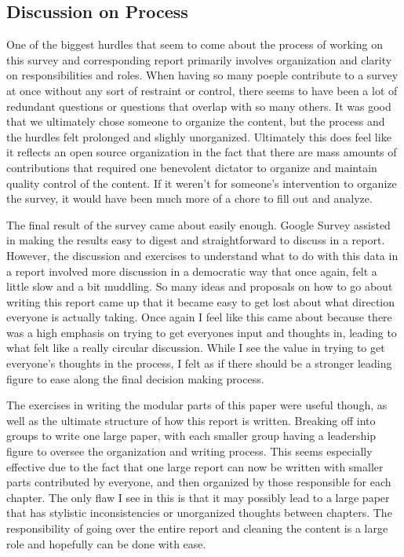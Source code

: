 \subsection{Discussion on Process}

One of the biggest hurdles that seem to come about the process of working on this survey and corresponding report primarily involves organization and clarity on responsibilities and roles. When having so many poeple contribute to a survey at once without any sort of restraint or control, there seems to have been a lot of redundant questions or questions that overlap with so many others. It was good that we ultimately chose someone to organize the content, but the process and the hurdles felt prolonged and slighly unorganized. Ultimately this does feel like it reflects an open source organization in the fact that there are mass amounts of contributions that required one benevolent dictator to organize and maintain quality control of the content. If it weren't for someone's intervention to organize the survey, it would have been much more of a chore to fill out and analyze. 

The final result of the survey came about easily enough. Google Survey assisted in making the results easy to digest and straightforward to discuss in a report. However, the discussion and exercises to understand what to do with this data in a report involved more discussion in a democratic way that once again, felt a little slow and a bit muddling. So many ideas and proposals on how to go about writing this report came up that it became easy to get lost about what direction everyone is actually taking. Once again I feel like this came about because there was a high emphasis on trying to get everyones input and thoughts in, leading to what felt like a really circular discussion. While I see the value in trying to get everyone's thoughts in the process, I felt as if there should be a stronger leading figure to ease along the final decision making process. 

The exercises in writing the modular parts of this paper were useful though, as well as the ultimate structure of how this report is written. Breaking off into groups to write one large paper, with each smaller group having a leadership figure to oversee the organization and writing process. This seems especially effective due to the fact that one large report can now be written with smaller parts contributed by everyone, and then organized by those responsible for each chapter. The only flaw I see in this is that it may possibly lead to a large paper that has stylistic inconsistencies or unorganized thoughts between chapters. The responsibility of going over the entire report and cleaning the content is a large role and hopefully can be done with ease. 

